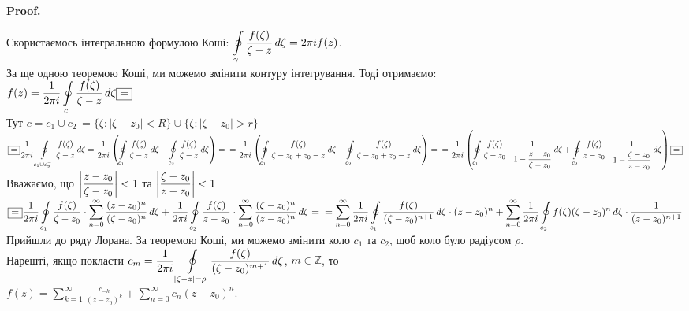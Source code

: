 \documentclass[a4paper, 10pt]{article}
\makeatletter
\def\qed{$\blacksquare$}
\theoremstyle{theoremdd}
\theoremstyle{theoremdd}
\theoremstyle{theoremdd}
\theoremstyle{theoremdd}
\theoremstyle{theoremdd}
\theoremstyle{theoremdd}
\theoremstyle{theoremdd}
\theoremstyle{theoremdd}
\renewenvironment{proof}[1][Proof.\\]{\par
\pushQED{\hfill \qed}%
\normalfont \topsep6\p@\@plus6\p@\relax
\trivlist
\item\relax
{\bfseries
#1\@addpunct{.}}\hspace\labelsep\ignorespaces
}{%
\popQED\endtrivlist\@endpefalse
}
\makeatother
\begin{document}
\begin{proof}
Скористаємось інтегральною формулою Коші:
	$\displaystyle \oint\displaylimits_{\gamma} \frac{f(\zeta)}{\zeta-z}\,d\zeta = 2\pi i f(z)$.\\
	За ще одною теоремою Коші, ми можемо змінити контуру інтегрування. Тоді отримаємо:\\
	$f(z) = \displaystyle \frac{1}{2\pi i} \oint\displaylimits_{c} \frac{f(\zeta)}{\zeta-z}\,d\zeta \boxed{=}$\\
	Тут $c = c_1 \cup c_2^- = \{\zeta: |\zeta-z_0|<R\} \cup \{\zeta: |\zeta-z_0|>r\}$\\
	 $ \boxed{=} \displaystyle\frac{1}{2\pi i}\oint\displaylimits_{c_1 \cup c_2^-} \frac{f(\zeta)}{\zeta-z}\,d\zeta = \frac{1}{2\pi i} \left(\oint\displaylimits_{c_1} \frac{f(\zeta)}{\zeta-z}\,d\zeta - \oint\displaylimits_{c_2} \frac{f(\zeta)}{\zeta-z}\,d\zeta \right) = \\ = \frac{1}{2\pi i} \left(\oint\displaylimits_{c_1} \frac{f(\zeta)}{\zeta-z_0+z_0-z}\,d\zeta - \oint\displaylimits_{c_2} \frac{f(\zeta)}{\zeta-z_0+z_0-z}\,d\zeta \right)=\\
	=\frac{1}{2\pi i} \left(\oint\displaylimits_{c_1} \frac{f(\zeta)}{\zeta-z_0} \cdot \frac{1}{1- \displaystyle\frac{z-z_0}{\zeta-z_0}}\,d\zeta + \oint\displaylimits_{c_2} \frac{f(\zeta)}{z-z_0} \cdot \frac{1}{1- \displaystyle\frac{\zeta-z_0}{z-z_0}}\,d\zeta \right) \boxed{=}$\\
	Вважаємо, що $\displaystyle \abs{\frac{z-z_0}{\zeta - z_0}}<1$ та $\displaystyle \abs{\frac{\zeta-z_0}{z-z_0}}<1$\\
	$\boxed{=} \displaystyle\frac{1}{2\pi i}\oint\displaylimits_{c_1} \frac{f(\zeta)}{\zeta-z_0} \cdot \sum_{n=0}^{\infty} \frac{(z-z_0)^n}{(\zeta-z_0)^n} \,d\zeta + \displaystyle\frac{1}{2\pi i}\oint\displaylimits_{c_2} \frac{f(\zeta)}{z-z_0} \cdot \sum_{n=0}^{\infty} \frac{(\zeta-z_0)^n}{(z-z_0)^n} \,d\zeta = 
	\\ = \sum_{n=0}^{\infty} \frac{1}{2\pi i}\oint\displaylimits_{c_1} \frac{f(\zeta)}{(\zeta - z_0)^{n+1}} \,d\zeta \cdot (z-z_0)^n + \sum_{n=0}^{\infty} \frac{1}{2\pi i}\oint\displaylimits_{c_2} f(\zeta)(\zeta-z_0)^n \,d\zeta \cdot \frac{1}{(z-z_0)^{n+1}}$\\
	Прийшли до ряду Лорана. За теоремою Коші, ми можемо змінити коло $c_1$ та $c_2$, щоб коло було радіусом $\rho$.\\
	Нарешті, якщо покласти $c_m = \displaystyle\frac{1}{2\pi i}\oint\displaylimits_{|\zeta-z|=\rho} \frac{f(\zeta)}{(\zeta-z_0)^{m+1}} \,d\zeta$, $m \in \mathbb{Z}$, то\\ $f(z) = \displaystyle\sum_{k=1}^{\infty}\frac{c_{-k}}{(z-z_0)^k}  + \sum_{n=0}^{\infty} c_n(z-z_0)^n$.
\end{proof}
\end{document}
